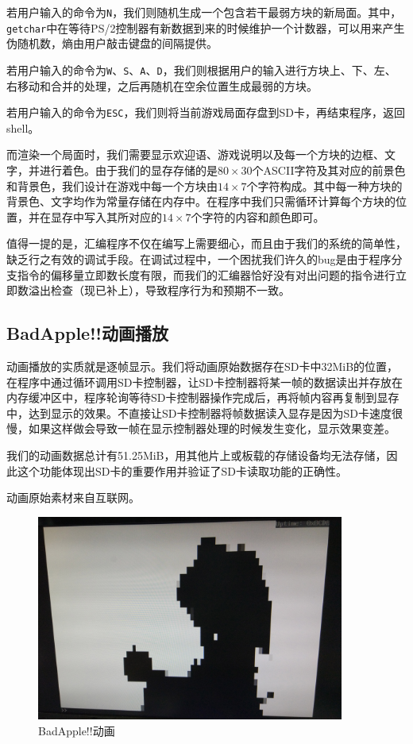 \documentclass[11pt,utf8]{report}
\begin{document}
若用户输入的命令为\texttt{N}，我们则随机生成一个包含若干最弱方块的新局面。其中，\texttt{getchar}中在等待PS/2控制器有新数据到来的时候维护一个计数器，可以用来产生伪随机数，熵由用户敲击键盘的间隔提供。

若用户输入的命令为\texttt{W}、\texttt{S}、\texttt{A}、\texttt{D}，我们则根据用户的输入进行方块上、下、左、右移动和合并的处理，之后再随机在空余位置生成最弱的方块。

若用户输入的命令为\texttt{ESC}，我们则将当前游戏局面存盘到SD卡，再结束程序，返回shell。

而渲染一个局面时，我们需要显示欢迎语、游戏说明以及每一个方块的边框、文字，并进行着色。由于我们的显存存储的是$80 \times 30$个ASCII字符及其对应的前景色和背景色，我们设计在游戏中每一个方块由$14 \times 7$个字符构成。其中每一种方块的背景色、文字均作为常量存储在内存中。在程序中我们只需循环计算每个方块的位置，并在显存中写入其所对应的$14 \times 7$个字符的内容和颜色即可。

值得一提的是，汇编程序不仅在编写上需要细心，而且由于我们的系统的简单性，缺乏行之有效的调试手段。在调试过程中，一个困扰我们许久的bug是由于程序分支指令的偏移量立即数长度有限，而我们的汇编器恰好没有对出问题的指令进行立即数溢出检查（现已补上），导致程序行为和预期不一致。

\subsection{BadApple!!动画播放} 
	\par 动画播放的实质就是逐帧显示。我们将动画原始数据存在SD卡中32MiB的位置，在程序中通过循环调用SD卡控制器，让SD卡控制器将某一帧的数据读出并存放在内存缓冲区中，程序轮询等待SD卡控制器操作完成后，再将帧内容再复制到显存中，达到显示的效果。不直接让SD卡控制器将帧数据读入显存是因为SD卡速度很慢，如果这样做会导致一帧在显示控制器处理的时候发生变化，显示效果变差。
	\par 我们的动画数据总计有51.25MiB，用其他片上或板载的存储设备均无法存储，因此这个功能体现出SD卡的重要作用并验证了SD卡读取功能的正确性。
	\par 动画原始素材来自互联网。
	
	\begin{center}
	\begin{figure}[h]
			\centering
			\includegraphics[width=0.9\textwidth]{badapple.jpg}
			\caption{BadApple!!动画}
		\end{figure}
	\end{center}
\end{document}
